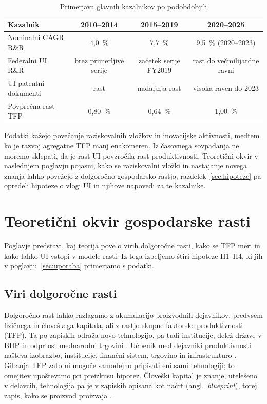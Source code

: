 \documentclass[12pt,a4paper]{article}
\begin{document}
\begin{table}[H]
\centering
\caption{Primerjava glavnih kazalnikov po podobdobjih}
\begin{tabular}{p{5.0cm}ccc}
\toprule
\textbf{Kazalnik} & \textbf{2010--2014} & \textbf{2015--2019} & \textbf{2020--2025} \\
\midrule
Nominalni CAGR R\&R & 4,0~\% & 7,7~\% & 9,5~\% (2020--2023) \\
Federalni UI R\&R & brez primerljive serije & začetek serije FY2019 & rast do večmilijardne ravni \\
UI-patentni dokumenti & rast & nadaljnja rast & visoka raven do 2023 \\
Povprečna rast TFP & 0,80~\% & 0,64~\% & 1,00~\% \\
\bottomrule
\end{tabular}
\end{table}

Podatki kažejo povečanje raziskovalnih vložkov in inovacijske aktivnosti, medtem ko je razvoj agregatne TFP manj enakomeren. Iz časovnega sovpadanja ne moremo sklepati, da je rast UI povzročila rast produktivnosti. Teoretični okvir v naslednjem poglavju pojasni, kako se raziskovalni vložki in nastajanje novega znanja lahko povežejo z dolgoročno gospodarsko rastjo, razdelek~\ref{sec:hipoteze} pa opredeli hipoteze o vlogi UI in njihove napovedi za te kazalnike.

\section{Teoretični okvir gospodarske rasti}\label{sec:teorija}
Poglavje predstavi, kaj teorija pove o virih dolgoročne rasti, kako se TFP meri in kako lahko UI vstopi v modele rasti. Iz tega izpeljemo štiri hipoteze H1--H4, ki jih v poglavju~\ref{sec:uporaba} primerjamo s podatki.

\subsection{Viri dolgoročne rasti}\label{sec:viri}
Dolgoročno rast lahko razlagamo z akumulacijo proizvodnih dejavnikov, predvsem fizičnega in človeškega kapitala, ali z rastjo skupne faktorske produktivnosti (TFP). Ta po zapiskih odraža novo tehnologijo, pa tudi institucije, delež države v BDP in odprtost mednarodni trgovini \parencite[str.~8]{polanec_rast}. Učbenik med dejavniki produktivnosti našteva izobrazbo, institucije, finančni sistem, trgovino in infrastrukturo \parencite[str.~144--145]{garin2021}. Gibanja TFP zato ni mogoče samodejno pripisati eni sami tehnologiji; to omejitev upoštevamo pri preizkusu hipotez. Človeški kapital je znanje, utelešeno v delavcih, tehnologija pa je v zapiskih opisana kot načrt (angl.~\emph{blueprint}), torej zapis, kako se proizvod proizvaja \parencite[str.~21]{polanec_rast}.
\end{document}
